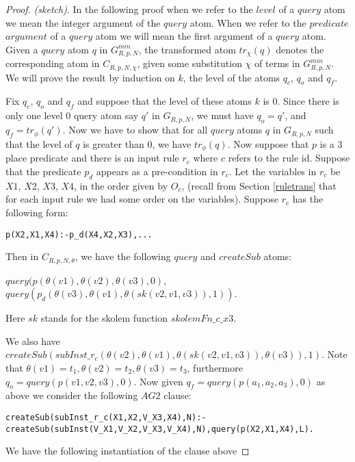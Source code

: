 \begin{proof} \textit{(sketch)}. In the following proof when we refer to the $level$ of a $query$ atom we mean the integer argument of the $query$ atom. When we refer to the $predicate$ $argument$ of a $query$ atom we will mean the first argument of a $query$ atom. Given a $query$ atom $q$ in $G_{R,p,N}^{min}$, the transformed atom $tr_{\chi}(q)$ denotes the corresponding atom in $C_{R,p,N,\chi}$, given some substitution $\chi$ of terms in $G_{R,p,N}^{min}$. We will prove the result by induction on $k$, the level of the atoms $q_{c}$, $q_{o}$ and $q_{f}$. 

Fix $q_{c}$, $q_{o}$ and $q_{f}$ and suppose that the level of these atoms $k$ is $0$. Since there is only one level $0$ query atom say $q'$ in $G_{R,p,N}$, we must have $q_{o}=q'$, and $q_{f} = tr_{\phi}(q')$. Now we have to show that for all $query$ atoms $q$ in $G_{R,p,N}$ such that the level of $q$ is greater than $0$, we have $tr_{\phi}(q)$. Now suppose that $p$ is a 3 place predicate and there is an input rule $r_{c}$ where ${c}$ refers to the rule id. Suppose that the predicate $p_{d}$ appears as a pre-condition in $r_{c}$. Let the variables in $r_{c}$ be $X1$, $X2$, $X3$, $X4$, in the order given by $O_{c}$, (recall from Section \ref{ruletrans} that for each input rule we had some order on the variables). Suppose $r_{c}$ has the following form:
\begin{verbatim}
p(X2,X1,X4):-p_d(X4,X2,X3),...    
\end{verbatim}

Then in $C_{R,p,N,\theta}$, we have the following $query$ and $createSub$ atoms:

$query(p(\theta(v1),\theta(v2),\theta(v3),0)$,\\ $query(p_{d}(\theta(v3),\theta(v1),\theta(sk(v2,v1,v3)),1))$. 

Here $sk$ stands for the skolem function $skolemFn\_c\_x3$. 

We also have\\
$createSub(subInst\_r_{c}(\theta(v2),\theta(v1),\theta(sk(v2,v1,v3)), \theta(v3)),1)$. Note that $\theta(v1)=t_{1},\theta(v2)=t_{2},\theta(v3)=t_{3}$, furthermore\\ $q_{o}= query(p(v1,v2,v3),0)$. Now given $q_{f} = query(p(a_{1},a_{2},a_{3}),0)$ as above we consider the following $AG2$ clause:
\begin{lstlisting}[frame=none]
createSub(subInst_r_c(X1,X2,V_X3,X4),N):-
createSub(subInst(V_X1,V_X2,V_X3,V_X4),N),query(p(X2,X1,X4),L).    
\end{lstlisting}
We have the following instantiation of the clause above


\end{proof}

